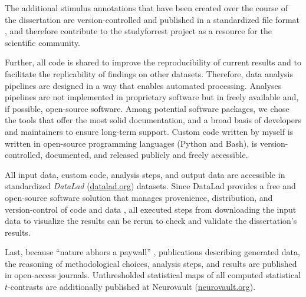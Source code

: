 
The additional stimulus annotations that have been created over the course of
the dissertation are version-controlled and published in a standardized file
format \citep{haeusler2021speechanno}, and therefore contribute to the
studyforrest project as a resource for the scientific community.

Further, all code is shared to improve the reproducibility of current results
and to facilitate the replicability of findings on other datasets.
Therefore, data analysis pipelines are designed in a way that enables automated
processing.
Analyses pipelines are not implemented in proprietary software but in freely
available and, if possible, open-source software.
Among potential software packages, we chose the tools that offer the most solid
documentation, and a broad basis of developers and maintainers to ensure
long-term support.
Custom code written by myself is written in open-source programming languages
(Python and Bash), is version-controlled, documented, and released publicly and
freely accessible.


All input data, custom code, analysis steps, and output data are accessible in
standardized \textit{DataLad} (\href{www.datalad.org}{datalad.org}) datasets.
Since DataLad provides a free and open-source software solution that manages
provenience, distribution, and version-control of code and data
\citep{halchenko2021datalad}, all executed steps from downloading the input data
to visualize the results can be rerun to check and validate the dissertation's
results.

Last, because ``nature abhors a paywall'' \citep{dupre2020nature}, publications
describing generated data, the reasoning of methodological choices, analysis
steps, and results are published in open-access journals.
Unthresholded statistical maps of all computed statistical $t$-contrasts are
additionally published at Neurovault
(\href{https://neurovault.org/}{neurovault.org}).


